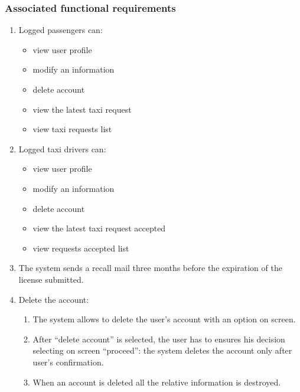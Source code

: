 \subsubsection{Associated functional requirements}
\begin{enumerate}

\item Logged passengers can:
\begin{itemize}
\item view user profile
\item modify an information
\item delete account
\item view the latest taxi request
\item view taxi requests list
\end{itemize}

\item Logged taxi drivers can:
\begin{itemize}
\item view user profile
\item modify an information
\item delete account
\item view the latest taxi request accepted
\item view requests accepted list
\end{itemize}

\item The system sends a recall mail three months before the expiration of the license submitted.

\item Delete the account: 
\begin{enumerate}
\item The system allows to delete the user's account with an option on screen.
\item After ``delete account'' is selected, the user has to ensures his decision selecting on screen ``proceed'': the system deletes the account only after user's confirmation.
\item When an account is deleted all the relative information is destroyed.
\end{enumerate}


\end{enumerate}
